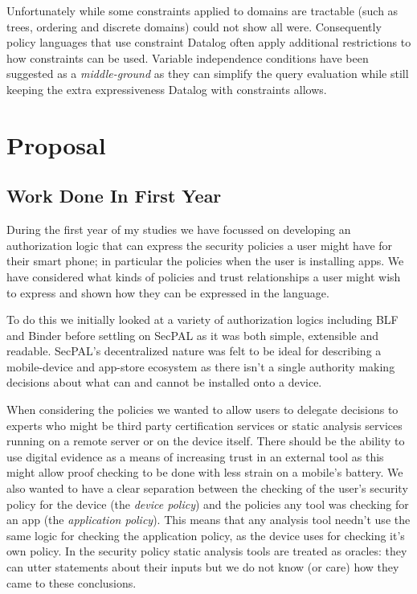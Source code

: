 \documentclass[a4paper,sfsidenotes]{tufte-book}
\begin{document}
Unfortunately while some constraints applied to domains are tractable (such as
trees, ordering and discrete domains) \citeauthor*{Li:2003ix} could not show
all were.  Consequently policy languages that use constraint Datalog often apply
additional restrictions to how constraints can be used.  Variable independence
conditions\cite{Chomicki:2000tz} have been suggested as a \emph{middle-ground}
as they can simplify the query evaluation while still keeping the extra
expressiveness Datalog with constraints allows.


\section{Proposal}

\subsection{Work Done In First Year}

During the first year of my studies we have focussed on developing an
authorization logic that can express the security policies a user might have for
their smart phone; in particular the policies when the user is installing apps.
We have considered what kinds of policies and trust
relationships a user might wish to express and shown how they can be expressed
in the language.

To do this we initially looked at a variety of authorization logics including
BLF\cite{Whitehead:2004bu} and Binder\cite{DeTreville:2002ff} before settling on
SecPAL as it was both simple, extensible and readable.  SecPAL's decentralized
nature was felt to be ideal for describing a mobile-device and app-store
ecosystem as there isn't a single authority making decisions about what can and
cannot be installed onto a device.  

When considering the policies we wanted to allow users to delegate decisions to
experts who might be third party certification services or static analysis
services running on a remote server or on the device itself.  There should be
the ability to use digital evidence\cite{Stark:2009uc} as a means of increasing
trust in an external tool as this might allow proof checking to be done with
less strain on a mobile's battery.  We also wanted to have a clear separation
between the checking of the user's security policy for the device (the
\emph{device policy}) and the policies any tool was checking for an app (the
\emph{application policy}).  This means that any analysis tool needn't use the
same logic for checking the application policy, as the device uses for checking
it's own policy.  In the security policy static analysis tools are treated as
oracles: they can utter statements about their inputs but we do not know (or
care) how they came to these conclusions.
\end{document}
